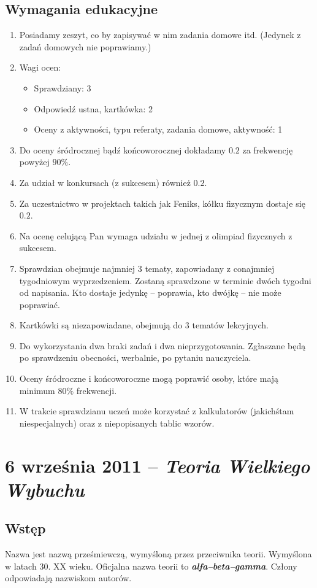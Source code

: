 \documentclass [a4paper, 11pt, oneside]{book}
\begin{document}
	\section{Wymagania edukacyjne}
		\begin{enumerate}
			\item Posiadamy zeszyt, co by zapisywać w nim zadania domowe itd. (Jedynek z zadań domowych nie poprawiamy.)
			\item Wagi ocen:
			\begin{itemize}
				\item Sprawdziany: 3
				\item Odpowiedź ustna, kartkówka: 2
				\item Oceny z aktywności, typu referaty, zadania domowe, aktywność: 1
			\end{itemize}
			\item Do oceny śródrocznej bądź końcoworocznej dokładamy $0.2$ za frekwencję powyżej $90\%$.
			\item Za udział w konkursach (z sukcesem) również $0.2$.
			\item Za uczestnictwo w projektach takich jak Feniks, kółku fizycznym dostaje się $0.2$.
			\item Na ocenę celującą Pan wymaga udziału w jednej z olimpiad fizycznych z sukcesem.
			\item Sprawdzian obejmuje najmniej 3 tematy, zapowiadany z conajmniej tygodniowym wyprzedzeniem. Zostaną sprawdzone w terminie dwóch tygodni od napisania. Kto dostaje jedynkę -- poprawia, kto dwójkę -- nie może poprawiać.
			\item Kartkówki są niezapowiadane, obejmują do 3 tematów lekcyjnych.
			\item Do wykorzystania dwa braki zadań i dwa nieprzygotowania. Zgłaszane będą po sprawdzeniu obecności, werbalnie, po pytaniu nauczyciela.
			\item Oceny śródroczne i końcoworoczne mogą poprawić osoby, które mają minimum $80\%$ frekwencji.
			\item W trakcie sprawdzianu uczeń może korzystać z kalkulatorów (jakichśtam niespecjalnych) oraz z niepopisanych tablic wzorów.
		\end{enumerate}
\chapter{6 września 2011 -- \textit{Teoria Wielkiego Wybuchu}}
	\section{Wstęp}
	Nazwa jest nazwą prześmiewczą, wymyśloną przez przeciwnika teorii. Wymyślona w latach 30. XX wieku. Oficjalna nazwa teorii to \textbf{\textit{alfa--beta--gamma}}. Człony odpowiadają nazwiskom autorów.
\end{document}
